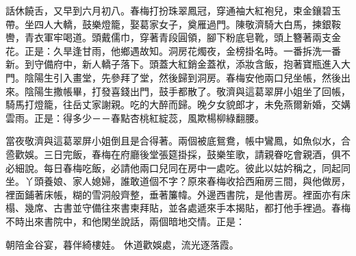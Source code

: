 \begin{showcontents}{}
話休饒舌，又早到六月初八。春梅打扮珠翠鳳冠，穿通袖大紅袍兒，束金鑲碧玉帶。坐四人大轎，鼓樂燈籠，娶葛家女子，奠雁過門。陳敬濟騎大白馬，揀銀鞍轡，青衣軍牢喝道。頭戴儒巾，穿著青段圓領，腳下粉底皂靴，頭上簪著兩支金花。正是：久旱逢甘雨，他鄉遇故知。洞房花燭夜，金榜掛名時。一番拆洗一番新。到守備府中，新人轎子落下。頭蓋大紅銷金蓋袱，添妝含飯，抱著寶瓶進入大門。陰陽生引入畫堂，先參拜了堂，然後歸到洞房。春梅安他兩口兒坐帳，然後出來。陰陽生撒帳畢，打發喜錢出門，鼓手都散了。敬濟與這葛翠屏小姐坐了回帳，騎馬打燈籠，往岳丈家謝親。吃的大醉而歸。晚夕女貌郎才，未免燕爾新婚，交媾雲雨。正是：得多少－－春點杏桃紅綻蕊，風欺楊柳綠翻腰。

當夜敬濟與這葛翠屏小姐倒且是合得著。兩個被底鴛鴦，帳中鸞鳳，如魚似水，合巹歡娛。三日完飯，春梅在府廳後堂張筵掛採，鼓樂笙歌，請親眷吃會親酒，俱不必細說。每日春梅吃飯，必請他兩口兒同在房中一處吃。彼此以姑妗稱之，同起同坐。丫頭養娘、家人媳婦，誰敢道個不字？原來春梅收拾西廂房三間，與他做房，裡面鋪著床帳，糊的雪洞般齊整，垂著簾幃。外邊西書院，是他書房。裡面亦有床榻、幾席、古書並守備往來書柬拜貼，並各處遞來手本揭貼，都打他手裡過。春梅不時出來書院中，和他閑坐說話，兩個暗地交情。正是：

朝陪金谷宴，暮伴綺樓娃。
休道歡娛處，流光逐落霞。



\end{showcontents}

